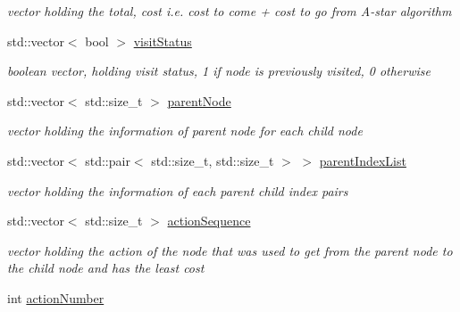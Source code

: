 \begin{DoxyCompactItemize}
\begin{DoxyCompactList}\small\item\em vector holding the total, cost i.\+e. cost to come + cost to go from A-\/star algorithm \end{DoxyCompactList}\item 
std\+::vector$<$ bool $>$ \hyperlink{classPathPlanner_a0b87bfdf63d46b850df6e1c51521646e}{visit\+Status}\hypertarget{classPathPlanner_a0b87bfdf63d46b850df6e1c51521646e}{}\label{classPathPlanner_a0b87bfdf63d46b850df6e1c51521646e}

\begin{DoxyCompactList}\small\item\em boolean vector, holding visit status, 1 if node is previously visited, 0 otherwise \end{DoxyCompactList}\item 
std\+::vector$<$ std\+::size\+\_\+t $>$ \hyperlink{classPathPlanner_a11cc8bafd250349a2068dffa47f7f009}{parent\+Node}\hypertarget{classPathPlanner_a11cc8bafd250349a2068dffa47f7f009}{}\label{classPathPlanner_a11cc8bafd250349a2068dffa47f7f009}

\begin{DoxyCompactList}\small\item\em vector holding the information of parent node for each child node \end{DoxyCompactList}\item 
std\+::vector$<$ std\+::pair$<$ std\+::size\+\_\+t, std\+::size\+\_\+t $>$ $>$ \hyperlink{classPathPlanner_a7aa56f17d8fe34d39be8fec0b1407be7}{parent\+Index\+List}\hypertarget{classPathPlanner_a7aa56f17d8fe34d39be8fec0b1407be7}{}\label{classPathPlanner_a7aa56f17d8fe34d39be8fec0b1407be7}

\begin{DoxyCompactList}\small\item\em vector holding the information of each parent child index pairs \end{DoxyCompactList}\item 
std\+::vector$<$ std\+::size\+\_\+t $>$ \hyperlink{classPathPlanner_addabde60666317748139616c18bcfafe}{action\+Sequence}\hypertarget{classPathPlanner_addabde60666317748139616c18bcfafe}{}\label{classPathPlanner_addabde60666317748139616c18bcfafe}

\begin{DoxyCompactList}\small\item\em vector holding the action of the node that was used to get from the parent node to the child node and has the least cost \end{DoxyCompactList}\item 
int \hyperlink{classPathPlanner_afab251a1e7b2288fe371314ffdccef6c}{action\+Number}\hypertarget{classPathPlanner_afab251a1e7b2288fe371314ffdccef6c}{}\label{classPathPlanner_afab251a1e7b2288fe371314ffdccef6c}


\end{DoxyCompactItemize}
